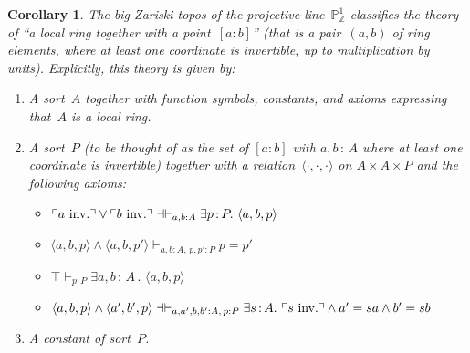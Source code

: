 \documentclass[10pt,reqno,a4paper]{amsbook}
\makeatletter
\theoremstyle{definition}
\theoremstyle{plain}
\newtheorem{cor}[defn]{Corollary}
\theoremstyle{remark}
\newcommand{\ZZ}{\mathbb{Z}}
\newcommand{\PP}{\mathbb{P}}
\newcommand{\?}{\,{:}\,}
\newcommand{\hg}{\mathbin{:}}  %
\renewcommand{\_}{\mathpunct{.}\,}
\newcommand{\speak}[1]{\ulcorner\text{\textnormal{#1}}\urcorner}
\newcommand{\inv}{inv.\@}
\makeatother
\begin{document}
\begin{cor}\label{cor:pp1-classifies}
The big Zariski topos of the projective line~$\PP^1_\ZZ$ classifies the theory of ``a local
ring together with a point~$[a \hg b]$'' (that is a pair~$(a,b)$ of ring elements,
where at least one coordinate is invertible, up to multiplication by units).
Explicitly, this theory is given by:
\begin{enumerate}
\item A sort~$A$ together with function symbols, constants, and axioms expressing
that~$A$ is a local ring.
\item A sort~$P$ (to be thought of as the set of $[a \hg b]$ with $a,b\?A$ where at
least one coordinate is invertible) together with a
relation~$\langle\cdot,\cdot,\cdot\rangle$ on $A \times A \times P$ and the
following axioms:
\begin{itemize}
\item $\speak{$a$ \inv} \vee \speak{$b$ \inv}
\dashv\vdash_{a,b{:}A} \exists p\?P\_ \langle a,b,p \rangle$
\item $\langle a,b,p \rangle \wedge \langle a,b,p' \rangle
\vdash_{a,b{:}A,\,p,p'{:}P} p = p'$
\item $\top \vdash_{p{:}P} \exists a,b\?A\_ \langle a,b,p \rangle$
\item $\langle a,b,p \rangle \wedge \langle a',b',p \rangle
\dashv\vdash_{a,a',b,b'{:}A,\, p{:}P} \exists s\?A\_ \speak{$s$ \inv} \wedge a' = s a \wedge b' = s b$
\end{itemize}
\item A constant of sort~$P$.
\end{enumerate}
\end{cor}
\end{document}
